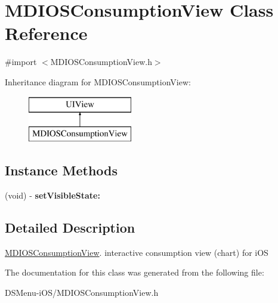\hypertarget{interface_m_d_i_o_s_consumption_view}{\section{M\-D\-I\-O\-S\-Consumption\-View Class Reference}
\label{interface_m_d_i_o_s_consumption_view}
}


{\ttfamily \#import $<$M\-D\-I\-O\-S\-Consumption\-View.\-h$>$}

Inheritance diagram for M\-D\-I\-O\-S\-Consumption\-View\-:\begin{figure}[H]
\begin{center}
\leavevmode
\includegraphics[height=2.000000cm]{interface_m_d_i_o_s_consumption_view}
\end{center}
\end{figure}
\subsection*{Instance Methods}
\begin{DoxyCompactItemize}
\item 
\hypertarget{interface_m_d_i_o_s_consumption_view_ade218159df49b9b7cf062d4c8f05b7b3}{(void) -\/ {\bfseries set\-Visible\-State\-:}}\label{interface_m_d_i_o_s_consumption_view_ade218159df49b9b7cf062d4c8f05b7b3}

\end{DoxyCompactItemize}


\subsection{Detailed Description}
\hyperlink{interface_m_d_i_o_s_consumption_view}{M\-D\-I\-O\-S\-Consumption\-View}. interactive consumption view (chart) for i\-O\-S 

The documentation for this class was generated from the following file\-:\begin{DoxyCompactItemize}
\item 
D\-S\-Menu-\/i\-O\-S/M\-D\-I\-O\-S\-Consumption\-View.\-h\end{DoxyCompactItemize}
